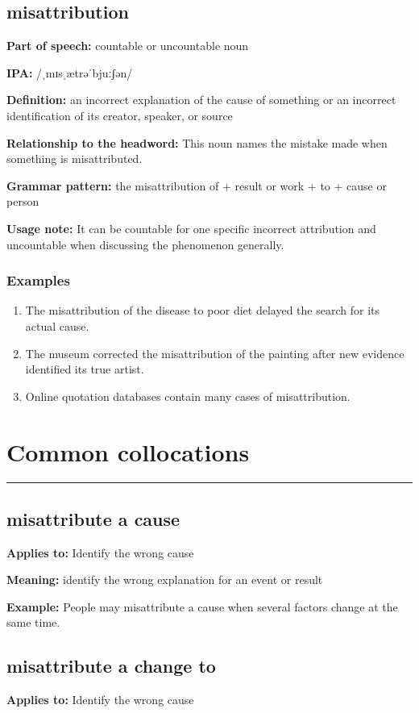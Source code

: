 \documentclass[11pt]{article}
\newcommand{\sectionrule}{\par\vspace{-0.5em}\noindent\textcolor{Accent}{\rule{\linewidth}{0.6pt}}\par}
\begin{document}
\subsection{misattribution}
\textbf{Part of speech:} countable or uncountable noun

\textbf{IPA:} /ˌmɪsˌætrəˈbjuːʃən/

\textbf{Definition:} an incorrect explanation of the cause of something or an incorrect identification of its creator, speaker, or source

\textbf{Relationship to the headword:} This noun names the mistake made when something is misattributed.

\textbf{Grammar pattern:} the misattribution of + result or work + to + cause or person

\textbf{Usage note:} It can be countable for one specific incorrect attribution and uncountable when discussing the phenomenon generally.

\subsubsection{Examples}
\begin{enumerate}
  \item The misattribution of the disease to poor diet delayed the search for its actual cause.
  \item The museum corrected the misattribution of the painting after new evidence identified its true artist.
  \item Online quotation databases contain many cases of misattribution.
\end{enumerate}

\section{Common collocations}
\sectionrule
\subsection{misattribute a cause}
\textbf{Applies to:} Identify the wrong cause

\textbf{Meaning:} identify the wrong explanation for an event or result

\textbf{Example:} People may misattribute a cause when several factors change at the same time.

\subsection{misattribute a change to}
\textbf{Applies to:} Identify the wrong cause
\end{document}

